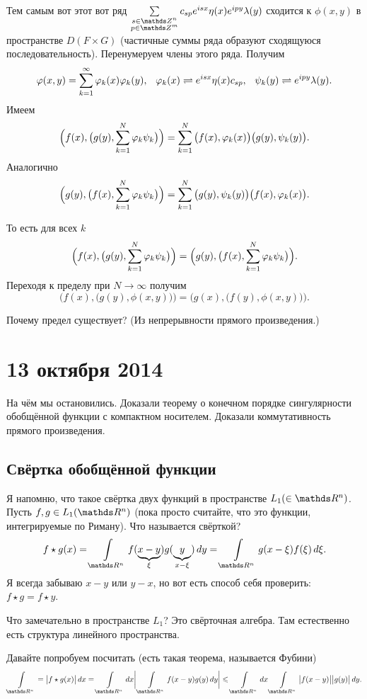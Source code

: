 \begin{Proof}
\begin{enumerate}
Тем самым вот этот вот ряд $\sum\limits_{\substack{s\in\Z^n\\ p\in\Z^m}}c_{sp} e^{isx}\eta(x)e^{ipy}\lambda(y)$ сходится к $\phi(x,y)$ в пространстве $D(F\times G)$ (частичные суммы ряда образуют сходящуюся последовательность). Перенумеруем члены этого ряда. Получим
\[\phi(x,y) = \ry\phi k(x)\phi_k(y),\pau \phi_k(x)\rightleftharpoons e^{isx}\eta(x) c_{sp},\pau \psi_k(y) \rightleftharpoons e^{ipy}\lambda(y).\]
Имеем
\[\Big(f(x),\big(g(y),\sum\limits_{k = 1}^{N} \varphi_k\psi_k\big)\Big) = \sum\limits_{k = 1}^{N}\big(f(x),\varphi_k(x)\big)\big(g(y),\psi_k(y)\big).
\]
Аналогично 
\[\Big(g(y),\big(f(x),\sum\limits_{k = 1}^{N} \varphi_k\psi_k\big)\Big) = \sum\limits_{k = 1}^{N}\big(g(y),\psi_k(y)\big)\big(f(x),\varphi_k(x)\big).
\]

То есть для всех $k$
\[ \Big(f(x),\big(g(y),\sum\limits_{k = 1}^{N} \varphi_k\psi_k\big)\Big) = \Big(g(y),\big(f(x),\sum\limits_{k = 1}^{N} \varphi_k\psi_k\big)\Big).\]
Переходя к пределу при $N\to\infty$ получим
\[\Big(f(x),\big(g(y),\phi(x,y)\big)\Big) = \Big(g(x),\big(f(y),\phi(x,y)\big)\Big).\]
\end{enumerate}
\end{Proof}

\begin{Task}
 Почему предел существует? (Из непрерывности прямого произведения.)
\end{Task}

\section{13 октября 2014}
На чём мы остановились. Доказали теорему о конечном порядке сингулярности обобщённой функции с компактном носителем. Доказали коммутативность прямого произведения.

\subsection{Свёртка обобщённой функции}
Я напомню, что такое свёртка двух функций в пространстве $L_1(\in\R^n)$. Пусть $f,g\in L_1(\R^n)$ (пока просто считайте, что это функции, интегрируемые по Риману). Что называется свёрткой?
\[ f \star g (x) = \int\limits_{\R^n} f(\underbrace{x-y}_{\xi})g(\underbrace{y}_{x-\xi})\,dy = \int\limits_{\R^n}g(x-\xi)f(\xi)\,d\xi.\]
Я всегда забываю $x-y$ или $y-x$, но вот есть способ себя проверить: $f\star g = f\star y$.

Что замечательно в пространстве $L_1$? Это свёрточная алгебра. Там естественно есть структура линейного пространства.

Давайте попробуем посчитать (есть такая теорема, называется Фубини)
\[\Gint{\R^n}
=\big|f\star g(x)\big|\,dx = \Gint{\R^n}dx\bigg|\Gint{\R^n}f(x-y)g(y)\,dy\bigg|\le \Gint{\R^n}dx\Gint{\R^n}\big|f(x-y)\big|\big|g(y)\big|\,dy.\]

